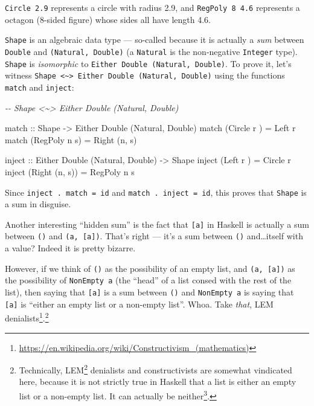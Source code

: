 \documentclass[]{article}
\newenvironment{Shaded}{}{}
\newcommand{\CommentTok}[1]{\textcolor[rgb]{0.38,0.63,0.69}{\textit{#1}}}
\newcommand{\DataTypeTok}[1]{\textcolor[rgb]{0.56,0.13,0.00}{#1}}
\newcommand{\NormalTok}[1]{#1}
\newcommand{\OtherTok}[1]{\textcolor[rgb]{0.00,0.44,0.13}{#1}}
\renewcommand{\href}[2]{#2\footnote{\url{#1}}}
\begin{document}
\texttt{Circle\ 2.9} represents a circle with radius 2.9, and
\texttt{RegPoly\ 8\ 4.6} represents a octagon (8-sided figure) whose sides all
have length 4.6.

\texttt{Shape} is an algebraic data type --- so-called because it is actually a
\emph{sum} between \texttt{Double} and \texttt{(Natural,\ Double)} (a
\texttt{Natural} is the non-negative \texttt{Integer} type). \texttt{Shape} is
\emph{isomorphic} to \texttt{Either\ Double\ (Natural,\ Double)}. To prove it,
let's witness
\texttt{Shape\ \textless{}\textasciitilde{}\textgreater{}\ Either\ Double\ (Natural,\ Double)}
using the functions \texttt{match} and \texttt{inject}:

\begin{Shaded}
\begin{Highlighting}[]
\CommentTok{{-}{-} Shape <\textasciitilde{}> Either Double (Natural, Double)}

\OtherTok{match ::} \DataTypeTok{Shape} \OtherTok{{-}>} \DataTypeTok{Either} \DataTypeTok{Double}\NormalTok{ (}\DataTypeTok{Natural}\NormalTok{, }\DataTypeTok{Double}\NormalTok{)}
\NormalTok{match (}\DataTypeTok{Circle}\NormalTok{  r  ) }\OtherTok{=} \DataTypeTok{Left}\NormalTok{ r}
\NormalTok{match (}\DataTypeTok{RegPoly}\NormalTok{ n s) }\OtherTok{=} \DataTypeTok{Right}\NormalTok{ (n, s)}

\OtherTok{inject ::} \DataTypeTok{Either} \DataTypeTok{Double}\NormalTok{ (}\DataTypeTok{Natural}\NormalTok{, }\DataTypeTok{Double}\NormalTok{) }\OtherTok{{-}>} \DataTypeTok{Shape}
\NormalTok{inject (}\DataTypeTok{Left}\NormalTok{   r    ) }\OtherTok{=} \DataTypeTok{Circle}\NormalTok{  r}
\NormalTok{inject (}\DataTypeTok{Right}\NormalTok{ (n, s)) }\OtherTok{=} \DataTypeTok{RegPoly}\NormalTok{ n s}
\end{Highlighting}
\end{Shaded}

Since \texttt{inject\ .\ match\ =\ id} and \texttt{match\ .\ inject\ =\ id},
this proves that \texttt{Shape} is a sum in disguise.

Another interesting ``hidden sum'' is the fact that \texttt{{[}a{]}} in Haskell
is actually a sum between \texttt{()} and \texttt{(a,\ {[}a{]})}. That's right
--- it's a sum between \texttt{()} and\ldots itself with a value? Indeed it is
pretty bizarre.

However, if we think of \texttt{()} as the possibility of an empty list, and
\texttt{(a,\ {[}a{]})} as the possibility of \texttt{NonEmpty\ a} (the ``head''
of a list consed with the rest of the list), then saying that \texttt{{[}a{]}}
is a sum between \texttt{()} and \texttt{NonEmpty\ a} is saying that
\texttt{{[}a{]}} is ``either an empty list or a non-empty list''. Whoa. Take
\emph{that},
\href{https://en.wikipedia.org/wiki/Constructivism_(mathematics)}{LEM
denialists}.\footnote{Technically,
  \href{https://en.wikipedia.org/wiki/Law_of_excluded_middle}{LEM} denialists
  and constructivists are somewhat vindicated here, because it is not strictly
  true in Haskell that a list is either an empty list or a non-empty list. It
  can actually \href{https://wiki.haskell.org/Bottom}{be neither}.}
\end{document}

